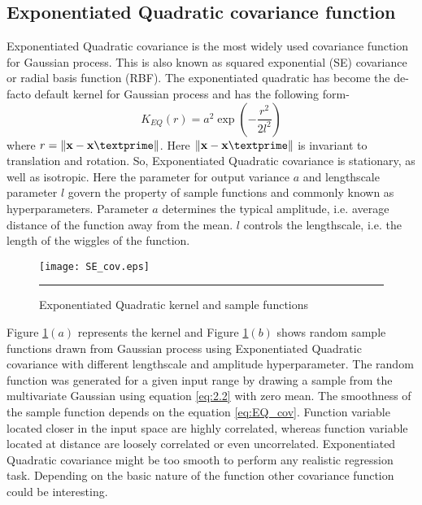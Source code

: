 \subsection{Exponentiated Quadratic covariance function}
Exponentiated Quadratic covariance is the most widely used covariance function for Gaussian
process. This is also known as squared exponential (SE) covariance or radial basis function (RBF).
The exponentiated quadratic has become the de-facto default kernel for Gaussian process and
has the following form-
\begin{equation} \label{eq:EQ_cov}
K_{EQ}(r)= a^2 \exp \left(-\frac{r^2}{2l^2}\right)
\end{equation}
where $r=\lVert \textbf{x}-\textbf{x}\textprime \rVert$. 
Here $\lVert \textbf{x}-\textbf{x}\textprime \rVert$ is invariant to translation and rotation.
So, Exponentiated Quadratic covariance is stationary, as well as isotropic.
Here the parameter for output variance $a$ and lengthscale parameter $l$ govern the property of
sample functions and commonly known as hyperparameters. Parameter $a$ determines the typical amplitude, i.e. 
average distance of the function away from the mean. $l$ controls the lengthscale, i.e. the length 
of the wiggles of the function. 

\begin{figure}[t]
	\centering
		\texttt{[image: SE\_cov.eps]}
		\rule{35em}{0.5pt}
	\caption[Exponentiated Quadratic kernel and sample functions]
		{Exponentiated Quadratic kernel and sample functions}
	\label{fig:Exponentiated_Quadratic_covariance}
\end{figure}

Figure \ref{fig:Exponentiated_Quadratic_covariance}$(a)$ represents the kernel and 
Figure \ref{fig:Exponentiated_Quadratic_covariance}$(b)$ shows random sample 
functions drawn from Gaussian process using Exponentiated Quadratic covariance with different
lengthscale and amplitude hyperparameter. The random function was generated for a given input
range by drawing a sample from the multivariate Gaussian using equation \ref{eq:2.2} with zero mean. 
The smoothness of the sample function depends on the equation \ref{eq:EQ_cov}. Function variable
located closer in the input space are highly correlated, whereas function variable located at distance
are loosely correlated or even uncorrelated. Exponentiated Quadratic covariance might be
too smooth to perform any realistic regression task. Depending on the basic nature of the function
other covariance function could be interesting.

